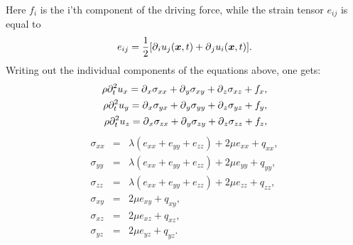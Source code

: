 \documentclass[11pt]{article}
\begin{document}
%
Here $f_i$ is the i'th component of the driving force, while the strain
tensor $e_{ij}$
is equal to
%
\begin{eqnarray}
    e_{ij} = \frac{1}{2}[\mbox{$\partial$}_i u_j(\mbox{\boldmath $x$}, t) + \mbox{$\partial$}_j u_i(\mbox{\boldmath $x$},t)].
					  \label{eq:iso-strain}
\end{eqnarray}
%
Writing out the individual components of the equations above, one gets:
%
\begin{eqnarray*}
  \rho \partial^2_t{u}_x = \mbox{$\partial$}_x \sigma_{xx} +\mbox{$\partial$}_y \sigma_{xy} +\mbox{$\partial$}_z \sigma_{xz} 
                                                      + f_x, \\
  \rho \partial^2_t{u}_y = \mbox{$\partial$}_x \sigma_{yx} +\mbox{$\partial$}_y \sigma_{yy} +\mbox{$\partial$}_z \sigma_{yz} 
                                                      + f_y, \\
  \rho \partial^2_t{u}_z = \mbox{$\partial$}_x \sigma_{zx} +\mbox{$\partial$}_y \sigma_{zy} +\mbox{$\partial$}_z \sigma_{zz} 
                                                      + f_z,
\end{eqnarray*}
%
\begin{eqnarray*}
  \sigma_{xx} & = & \lambda \left (e_{xx} + e_{yy} + e_{zz}\right)+ 2\mu e_{xx} 
                                                   +q_{xx}, \\
  \sigma_{yy} & = & \lambda \left (e_{xx} + e_{yy} + e_{zz}\right)+ 2\mu e_{yy} 
                                                   +q_{yy}, \\
  \sigma_{zz} & = & \lambda \left (e_{xx} + e_{yy} + e_{zz}\right)+ 2\mu e_{zz} 
                                                   +q_{zz}, \\
  \sigma_{xy} & = & 2\mu e_{xy} +q_{xy}, \\
  \sigma_{xz} & = & 2\mu e_{xz} +q_{xz}, \\
  \sigma_{yz} & = & 2\mu e_{yz} +q_{yz}.
\end{eqnarray*}
%
\end{document}
